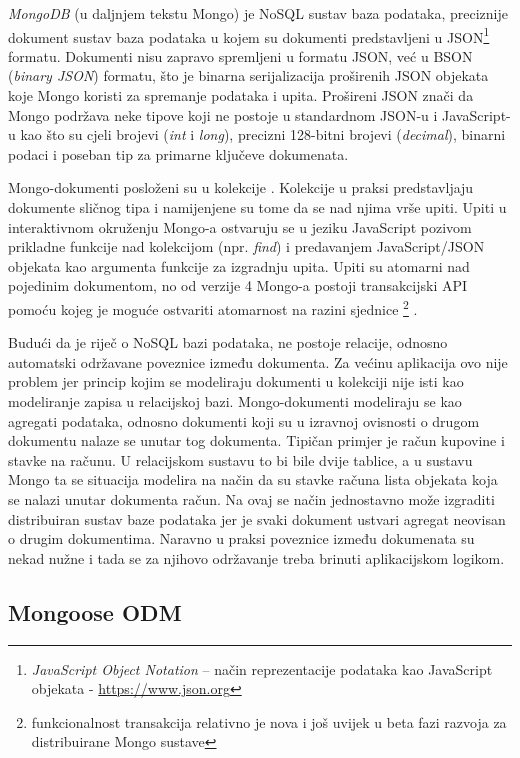 \documentclass[times, utf8, diplomski, numeric]{fer}
\newcommand{\razmaks}{\vspace{10pt}}
\begin{document}
\emph{MongoDB} (u daljnjem tekstu Mongo) je NoSQL sustav baza podataka, preciznije dokument sustav baza podataka u kojem su dokumenti predstavljeni u JSON\footnote{
    \emph{JavaScript Object Notation} – način reprezentacije podataka kao JavaScript objekata - \url{https://www.json.org}
} formatu.
Dokumenti nisu zapravo spremljeni u formatu JSON, već u BSON (\emph{binary JSON}) formatu, što je binarna serijalizacija proširenih JSON objekata koje Mongo koristi za spremanje podataka i upita.
Prošireni JSON znači da Mongo podržava neke tipove koji ne postoje u standardnom JSON-u i JavaScript-u kao što su cjeli brojevi (\emph{int} i \emph{long}), precizni 128-bitni brojevi (\emph{decimal}), binarni podaci i poseban tip za primarne ključeve dokumenata.

Mongo-dokumenti posloženi su u kolekcije .
Kolekcije u praksi predstavljaju dokumente sličnog tipa i namijenjene su tome da se nad njima vrše upiti.
Upiti u interaktivnom okruženju Mongo-a ostvaruju se u jeziku JavaScript pozivom prikladne funkcije nad kolekcijom (npr. \emph{find}) i predavanjem JavaScript/JSON objekata kao argumenta funkcije za izgradnju upita. Upiti su atomarni  nad pojedinim dokumentom, no od verzije 4 Mongo-a postoji transakcijski API pomoću kojeg je moguće ostvariti atomarnost na razini sjednice \footnote{
    funkcionalnost transakcija relativno je nova i još uvijek u beta fazi razvoja za distribuirane Mongo sustave
} \citep{mongo}.

Budući da je riječ o NoSQL bazi podataka, ne postoje relacije, odnosno automatski održavane poveznice između dokumenta.
Za većinu aplikacija ovo nije problem jer princip kojim se modeliraju dokumenti u kolekciji nije isti kao modeliranje zapisa u relacijskoj bazi.
Mongo-dokumenti modeliraju se kao agregati podataka, odnosno dokumenti koji su u izravnoj ovisnosti o drugom dokumentu nalaze se unutar tog dokumenta.
Tipičan primjer je račun kupovine i stavke na računu.
U relacijskom sustavu to bi bile dvije tablice, a u sustavu Mongo ta se situacija modelira na način da su stavke računa lista objekata koja se nalazi unutar dokumenta račun.
Na ovaj se način jednostavno može izgraditi distribuiran sustav baze podataka jer je svaki dokument ustvari agregat neovisan o drugim dokumentima.
Naravno u praksi poveznice između dokumenata su nekad nužne i tada se za njihovo održavanje treba brinuti aplikacijskom logikom.


\razmaks
\subsection{Mongoose ODM}
\end{document}
